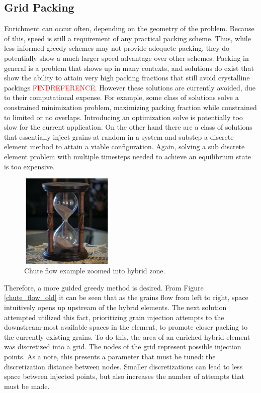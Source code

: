 \subsection{Grid Packing}
Enrichment can occur often, depending on the geometry of the problem. Because of this, speed is still a requirement of any practical packing scheme. Thus, while less informed greedy schemes may not provide adequete packing, they do potentially show a much larger speed advantage over other schemes. Packing in general is a problem that shows up in many contexts, and solutions do exist that show the ability to attain very high packing fractions that still avoid crystalline packings \textcolor{red}{FINDREFERENCE}. However these solutions are currently avoided, due to their computational expense. For example, some class of solutions solve a constrained minimization problem, maximizing packing fraction while constrained to limited or no overlaps. Introducing an optimization solve is potentially too slow for the current application. On the other hand there are a class of solutions that essentially inject grains at random in a system and substep a discrete element method to attain a viable configuration. Again, solving a sub discrete element problem with multiple timesteps needed to achieve an equilibrium state is too expensive.

\begin{figure}[htp] 
    \centering
    \includegraphics[width=0.4\textwidth]{figs/hourglass_whole.jpg}
    \caption{Chute flow example zoomed into hybrid zone.}
    \label{chute_flow_old_closeup}
\end{figure}

Therefore, a more guided greedy method is desired. From Figure \ref{chute_flow_old} it can be seen that as the grains flow from left to right, space intuitively opens up upstream of the hybrid elements. The next solution attempted utilized this fact, prioritizing grain injection attempts to the downstream-most available spaces in the element, to promote closer packing to the currently existing grains. To do this, the area of an enriched hybrid element was discretized into a grid. The nodes of the grid represent possible injection points. As a note, this presents a parameter that must be tuned: the discretization distance between nodes. Smaller discretizations can lead to less space between injected points, but also increases the number of attempts that must be made. 

